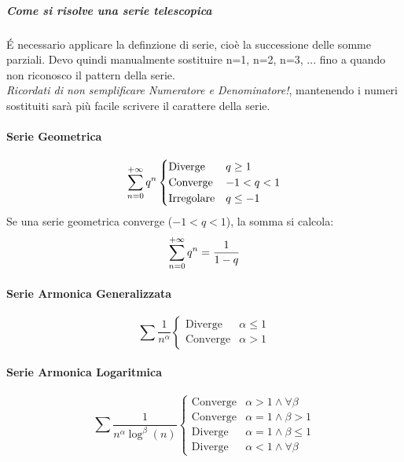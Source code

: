 \documentclass[12pt, a4paper, openany]{book}
\begin{document}
\subparagraph{Come si risolve una serie telescopica}
É necessario applicare la definzione di serie, cioè la successione delle somme
parziali. Devo quindi manualmente sostituire n=1, n=2, n=3, ...
fino a quando non riconosco il pattern della serie.
\\ \emph{Ricordati di non semplificare Numeratore e Denominatore!},
mantenendo i numeri sostituiti sarà più facile scrivere il carattere della serie.


\paragraph*{Serie Geometrica}
\begin{equation*}
	\sum_{n=0}^{+\infty} q^n \begin{cases}
		\text{Diverge}    & q\geq 1  \\
		\text{Converge}   & -1<q<1   \\
		\text{Irregolare} & q\leq -1
	\end{cases}
\end{equation*}
 Se una serie geometrica converge ($-1<q<1$),
la somma si calcola:
\[
	\sum_{n=0}^{+\infty} q^n = \frac{1}{1-q}
\]

\paragraph*{Serie Armonica Generalizzata}
\begin{equation*}
	\sum \frac{1}{n^\alpha} \begin{cases}
		\text{Diverge}  & \alpha\leq 1 \\
		\text{Converge} & \alpha> 1
	\end{cases}
\end{equation*}

\paragraph*{Serie Armonica Logaritmica}
\begin{equation*}
	\sum \frac{1}{n^\alpha \log^\beta(n)}
	\begin{cases}
		\text{Converge} & \alpha > 1 \wedge \forall \beta \\
		\text{Converge} & \alpha = 1 \wedge \beta > 1     \\
		\text{Diverge}  & \alpha = 1 \wedge \beta \leq 1  \\
		\text{Diverge}  & \alpha < 1 \wedge \forall \beta
	\end{cases}
\end{equation*}
\end{document}
